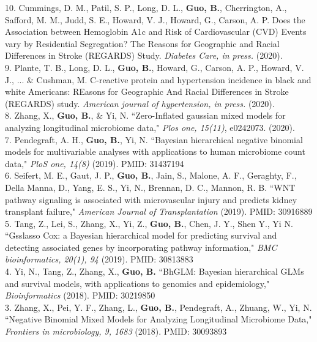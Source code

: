 \documentclass[10pt]{article}
\begin{document}
10. Cummings, D. M., Patil, S. P., Long, D. L., \textbf{Guo, B.}, Cherrington, A., Safford, M. M., Judd, S. E., Howard, V. J., Howard, G., Carson, A. P. Does the Association between Hemoglobin A1c and Risk of Cardiovascular (CVD) Events vary by Residential Segregation? The Reasons for Geographic and Racial Differences in Stroke (REGARDS) Study. \textit{Diabetes Care, in press.} (2020).\\

9. Plante, T. B., Long, D. L., \textbf{Guo, B.}, Howard, G., Carson, A. P., Howard, V. J., ... & Cushman, M. C-reactive protein and hypertension incidence in black and white Americans: REasons for Geographic And Racial Differences in Stroke (REGARDS) study. \textit{American journal of hypertension, in press.} (2020). \\

8. Zhang, X., \textbf{Guo, B.}, & Yi, N. ``Zero-Inflated gaussian mixed models for analyzing longitudinal microbiome data," \textit{Plos one, 15(11)}, e0242073. (2020).\\

7. Pendegraft, A. H., \textbf{Guo, B.}, Yi, N. ``Bayesian hierarchical negative binomial models for multivariable analyses with applications to human microbiome count data," \textit{PloS one, 14(8)} (2019). PMID: 31437194\\

6. Seifert, M. E., Gaut, J. P., \textbf{Guo, B.}, Jain, S., Malone, A. F., Geraghty, F., Della Manna, D., Yang, E. S., Yi, N., Brennan, D. C., Mannon, R. B.  ``WNT pathway signaling is associated with microvascular injury and predicts kidney transplant failure," \textit{American Journal of Transplantation} (2019). PMID: 30916889 \\

5. Tang, Z., Lei, S., Zhang, X., Yi, Z., \textbf{Guo, B.}, Chen, J. Y., Shen Y., Yi N.  ``Gsslasso Cox: a Bayesian hierarchical model for predicting survival and detecting associated genes by incorporating pathway information," \textit{BMC bioinformatics, 20(1), 94} (2019). PMID: 30813883\\

4.  Yi, N., Tang, Z., Zhang, X., \textbf{Guo, B.}  ``BhGLM: Bayesian hierarchical GLMs and survival models, with applications to genomics and epidemiology," \textit{Bioinformatics} (2018). PMID: 30219850\\

3. Zhang, X., Pei, Y. F., Zhang, L., \textbf{Guo, B.}, Pendegraft, A., Zhuang, W., Yi, N. ``Negative Binomial Mixed Models for Analyzing Longitudinal Microbiome Data," \textit{Frontiers in microbiology, 9, 1683} (2018). PMID: 30093893\\
\end{document}

